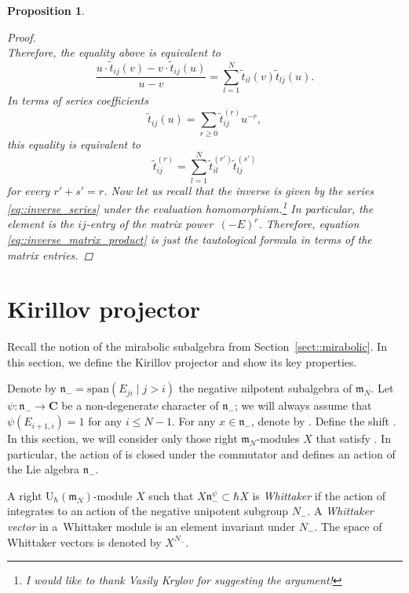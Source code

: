\documentclass[10pt,a4paper]{article}
\numberwithin{equation}{section}
\newtheorem{Proposition}[Theorem]{Proposition}
{ \theoremstyle{definition}
	\newtheorem{Definition}[Theorem]{Definition}
	\newtheorem{Note}[Theorem]{Note}
	\newtheorem{Example}[Theorem]{Example}
	\newtheorem{Remark}[Theorem]{Remark} }
\newcommand{\C}{\mathbf{C}}
\newcommand{\U}{\mathrm{U}_{\hbar}}
\newcommand{\n}{\mathfrak{n}}
\newcommand{\m}{\mathfrak{m}}
\newcommand{\gl}{\mathfrak{gl}}
\begin{document}
\begin{Proposition}
\begin{proof}
\[			\]
			Therefore, the equality above is equivalent to
			\[
			\frac{u\cdot \tilde{t}_{ij}(v) - v \cdot \tilde{t}_{ij}(u)}{u-v} = \sum\limits_{l=1}^N \tilde{t}_{il}(v) \tilde{t}_{lj}(u).
			\]
			In terms of series coefficients
			\[
			\tilde{t}_{ij}(u) = \sum\limits_{r\geq 0} \tilde{t}_{ij}^{(r)} u^{-r},
			\]
			this equality is equivalent to
			\begin{equation}
				\label{eq::inverse_matrix_product}
				\tilde{t}_{ij}^{(r)} = \sum\limits_{l=1}^{N} \tilde{t}_{il}^{(r')} \tilde{t}_{lj}^{(s')}
			\end{equation}
			for every $r' + s' = r$. Now let us recall that the inverse is given by the series \eqref{eq::inverse_series} under the evaluation homomorphism.\footnote{I would like to thank Vasily Krylov for suggesting the argument!} In particular, the element  is the $ij$-entry of the matrix power~$(-E)^r$. Therefore, equation \eqref{eq::inverse_matrix_product} is just the tautological formula  in terms of the matrix entries.
		\end{proof}
	\end{Proposition}
	
	\section{Kirillov projector}
	\label{sect::kirillov_projector}
	Recall the notion of the mirabolic subalgebra from Section~\ref{sect::mirabolic}. In this section, we define the Kirillov projector and show its key properties.
	
	Denote by $\n_- = \mathrm{span}(E_{ji}\mid j>i) $ the negative nilpotent subalgebra of $\m_N$. Let $\psi\colon \n_- \rightarrow \C$ be a non-degenerate character of $\n_-$; we will always assume that $\psi(E_{i+1,i}) = 1$ for any $i\leq N-1$. For any $x\in \n_-$, denote by . Define the shift \smash{$\n_-^{\psi} = \mathrm{span}\bigl(x^{\psi} \mid x\in \n_-\bigr) \subset \U(\gl_N)$}. In this section, we will consider only those right $\m_N$-modules $X$ that satisfy \smash{$X \n_-^{\psi} \subset \hbar X$}. In particular, the action of \smash{$\hbar^{-1} \n_-^{\psi}$} is closed under the commutator and defines an action of the Lie algebra $\n_-$.
	
	\begin{Definition}
		\label{def::whittaker_module}
		A right $\U(\m_N)$-module $X$ such that $X\n_-^{\psi} \subset \hbar X$ is \emph{Whittaker} if the action of~\smash{$\hbar^{-1} \n_-^{\psi}$} integrates to an action of the negative unipotent subgroup $N_-$. A \emph{Whittaker vector} in a~Whittaker module is an element invariant under $N_-$. The space of Whittaker vectors is denoted by $X^{N_-}$.
	\end{Definition}
	
\end{document}
